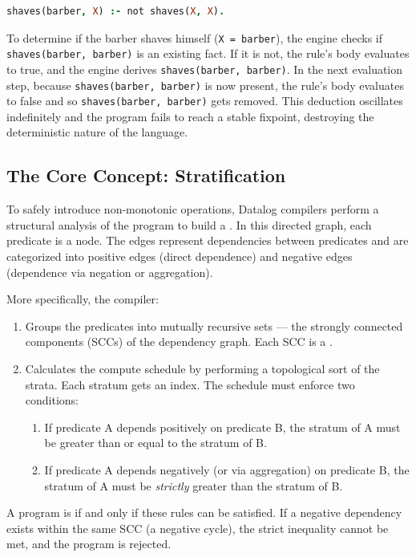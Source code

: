 \begin{lstlisting}[language=prolog, caption={The barber paradox.}]
shaves(barber, X) :- not shaves(X, X).
\end{lstlisting}

To determine if the barber shaves himself (\texttt{X = barber}), the engine checks if \texttt{shaves(barber, barber)} is an existing fact.
If it is not, the rule's body evaluates to true, and the engine derives \texttt{shaves(barber, barber)}. 
In the next evaluation step, because \texttt{shaves(barber, barber)} is now present, the rule's body evaluates to false and so \texttt{shaves(barber, barber)} gets removed. 
This deduction oscillates indefinitely and the program fails to reach a stable fixpoint, destroying the deterministic nature of the language.

\subsection{The Core Concept: Stratification}
To safely introduce non-monotonic operations, Datalog compilers perform a structural analysis of the program to build a . 
In this directed graph, each predicate is a node. The edges represent dependencies between predicates and are categorized into positive edges (direct dependence) and negative edges (dependence via negation or aggregation).

More specifically, the compiler:
\begin{enumerate}
    \item Groups the predicates into mutually recursive sets --- the strongly connected components (SCCs) of the dependency graph. Each SCC is a .
    \item Calculates the compute schedule by performing a topological sort of the strata. Each stratum gets an index. The schedule must enforce two conditions:
        \begin{enumerate}
            \item If predicate A depends positively on predicate B, the stratum of A must be greater than or equal to the stratum of B.
            \item If predicate A depends negatively (or via aggregation) on predicate B, the stratum of A must be \emph{strictly} greater than the stratum of B.
        \end{enumerate}
\end{enumerate}

A program is  if and only if these rules can be satisfied. 
If a negative dependency exists within the same SCC (a negative cycle), the strict inequality cannot be met, and the program is rejected. 

